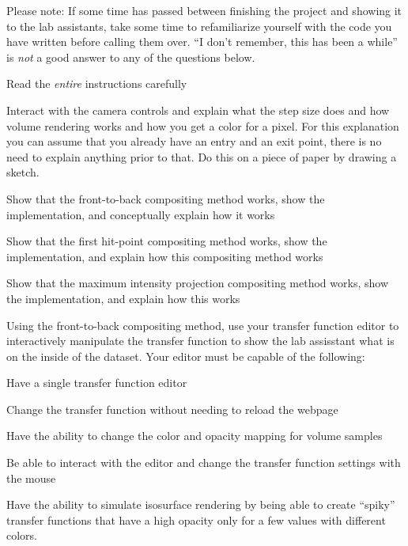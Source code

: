 \documentclass{labinstructions}
\begin{document}
Please note: If some time has passed between finishing the project and showing it to the lab assistants, take some time to refamiliarize yourself with the code you have written before calling them over.  ``I don't remember, this has been a while'' is \emph{not} a good answer to any of the questions below.
\begin{todolist}
  \item Read the \emph{entire} instructions carefully
  \item Interact with the camera controls and explain what the step size does and how volume rendering works and how you get a color for a pixel.  For this explanation you can assume that you already have an entry and an exit point, there is no need to explain anything prior to that.  Do this on a piece of paper by drawing a sketch.
  \item Show that the front-to-back compositing method works, show the implementation, and conceptually explain how it works
  \item Show that the first hit-point compositing method works, show the implementation, and explain how this compositing method works
  \item Show that the maximum intensity projection compositing method works, show the implementation, and explain how this works
  \item Using the front-to-back compositing method, use your transfer function editor to interactively manipulate the transfer function to show the lab assisstant what is on the inside of the dataset.  Your editor must be capable of the following:
  \begin{todolist}
    \item Have a single transfer function editor
    \item Change the transfer function without needing to reload the webpage
    \item Have the ability to change the color and opacity mapping for volume samples
    \item Be able to interact with the editor and change the transfer function settings with the mouse
    \item Have the ability to simulate isosurface rendering by being able to create ``spiky'' transfer functions that have a high opacity only for a few values with different colors.
  \end{todolist}
\end{todolist}
\end{document}
